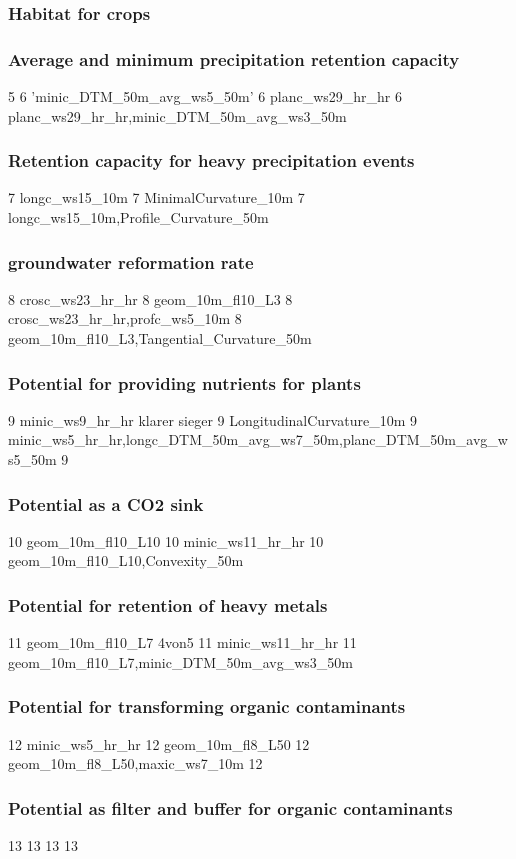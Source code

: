 \documentclass[preprint,12pt,authoryear]{elsarticle}
\begin{document}
\subsubsection{Habitat for crops}

\subsubsection{Average and minimum precipitation retention capacity}
5 
6 'minic_DTM_50m_avg_ws5_50m'
6 planc_ws29_hr_hr
6 planc_ws29_hr_hr,minic_DTM_50m_avg_ws3_50m

\subsubsection{Retention capacity for heavy precipitation events}
7 longc_ws15_10m
7 MinimalCurvature_10m 
7 longc_ws15_10m,Profile_Curvature_50m
\subsubsection{groundwater reformation rate}
8 crosc_ws23_hr_hr
8  geom_10m_fl10_L3
8 crosc_ws23_hr_hr,profc_ws5_10m
8  geom_10m_fl10_L3,Tangential_Curvature_50m
\subsubsection{Potential for providing nutrients for plants}
9 minic_ws9_hr_hr klarer sieger
9  LongitudinalCurvature_10m
9 minic_ws5_hr_hr,longc_DTM_50m_avg_ws7_50m,planc_DTM_50m_avg_ws5_50m
9 
\subsubsection{Potential as a CO2 sink}
10 geom_10m_fl10_L10
10 minic_ws11_hr_hr
10 geom_10m_fl10_L10,Convexity_50m


\subsubsection{Potential for retention of heavy metals}
11 geom_10m_fl10_L7 4von5
11 minic_ws11_hr_hr
11  geom_10m_fl10_L7,minic_DTM_50m_avg_ws3_50m 

\subsubsection{Potential for transforming organic contaminants}
12 minic_ws5_hr_hr
12 geom_10m_fl8_L50
12 geom_10m_fl8_L50,maxic_ws7_10m
12

\subsubsection{Potential as filter and buffer for organic contaminants}
13
13
13
13
\end{document}
